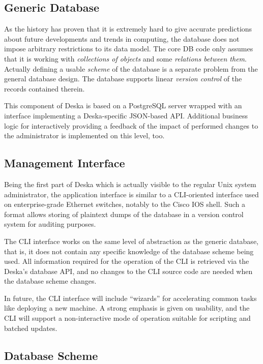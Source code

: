 \documentclass[a4paper]{jpconf}
\begin{document}
\subsection{Generic Database}

As the history has proven that it is extremely hard to give accurate predictions about future developments and trends in computing,
the database does not impose arbitrary restrictions to its data model.  The core DB code only assumes that it is working with {\em
collections of objects} and some {\em relations between them}. Actually defining a usable {\em scheme} of the database is a separate
problem from the general database design.  The database supports linear {\em version control} of the records contained therein.

This component of Deska is based on a PostgreSQL server wrapped with an interface implementing a Deska-specific JSON-based API.
Additional business logic for interactively providing a feedback of the impact of performed changes to the administrator is implemented
on this level, too.

\subsection{Management Interface}

Being the first part of Deska which is actually visible to the regular Unix system administrator, the application interface is similar
to a CLI-oriented interface used on enterprise-grade Ethernet switches, notably to the Cisco IOS shell.  Such a format allows storing
of plaintext dumps of the database in a version control system for auditing purposes.

The CLI interface works on the same level of abstraction as the generic database, that is, it does not contain any specific knowledge
of the database scheme being used.  All information required for the operation of the CLI is retrieved via the Deska's database API,
and no changes to the CLI source code are needed when the database scheme changes.

In future, the CLI interface will include ``wizards'' for accelerating common tasks like deploying a new machine.  A strong emphasis is
given on usability, and the CLI will support a non-interactive mode of operation suitable for scripting and batched updates.

\subsection{Database Scheme}
\end{document}
